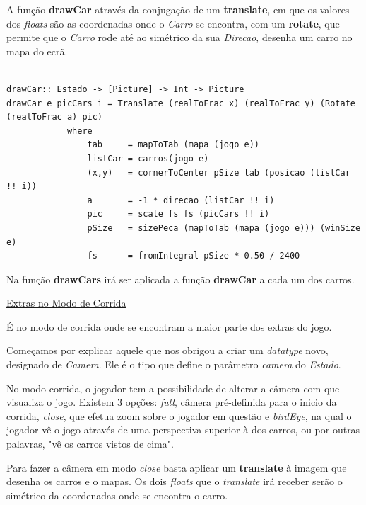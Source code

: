 \documentclass[a4paper]{report} %
\begin{document}
\normalsize

A função \textbf{drawCar} através da conjugação de um \textbf{translate}, em que os valores dos \textit{floats} são as coordenadas onde o \emph{Carro} se encontra, com um \textbf{rotate}, que permite que o \emph{Carro} rode até ao simétrico da sua \emph{Direcao}, desenha um carro no mapa do ecrã.

\scriptsize

\begin{verbatim}

drawCar:: Estado -> [Picture] -> Int -> Picture
drawCar e picCars i = Translate (realToFrac x) (realToFrac y) (Rotate (realToFrac a) pic)
            where
                tab     = mapToTab (mapa (jogo e))
                listCar = carros(jogo e)
                (x,y)   = cornerToCenter pSize tab (posicao (listCar !! i))
                a       = -1 * direcao (listCar !! i)
                pic     = scale fs fs (picCars !! i)
                pSize   = sizePeca (mapToTab (mapa (jogo e))) (winSize e)
                fs      = fromIntegral pSize * 0.50 / 2400

\end{verbatim}

\normalsize

Na função \textbf{drawCars} irá ser aplicada a função \textbf{drawCar} a cada um dos carros.

\newpage

\maketitle\underline{Extras no Modo de Corrida}

É no modo de corrida onde se encontram a maior parte dos extras do jogo.

Começamos por explicar aquele que nos obrigou a criar um \emph{datatype} novo, designado de \emph{Camera}. Ele é o tipo que define o parâmetro \emph{camera} do \emph{Estado}. 

No modo corrida, o jogador tem a possibilidade de alterar a câmera com que visualiza o jogo. Existem 3 opções: \emph{full}, câmera pré-definida para o inicio da corrida, \emph{close}, que efetua zoom sobre o jogador em questão e \emph{birdEye}, na qual o jogador vê o jogo através de uma perspectiva superior à dos carros, ou por outras palavras, "vê os carros vistos de cima".

Para fazer a câmera em modo \textit{close} basta aplicar um \textbf{translate} à imagem que desenha os carros e o mapas. Os dois \textit{floats} que o \textit{translate} irá receber serão o simétrico da coordenadas onde se encontra o carro.
\end{document}
